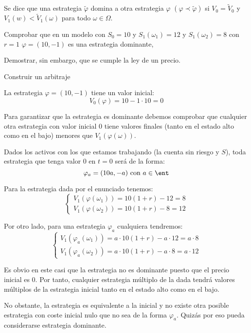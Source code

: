 \begin{problem}[5]
Se dice que una estrategia $\tilde{\varphi}$ domina a otra estrategia $\varphi$ $(\varphi \prec \tilde{\varphi})$ si $V_0=\tilde{V}_0$ y $V_1(w) < \tilde{V}_1(ω)$ para todo $ω \in Ω$.

\ppart Comprobar que en un modelo con $S_0=10$ y $S_1(ω_1)=12$ y $S_1(ω_2) = 8$ con $r=1$ $\varphi=(10,-1)$ es una estrategia dominante,

\ppart Demostrar, sin embargo, que se cumple la ley de un precio.

\ppart Construir un arbitraje
\solution

\spart
{}

La estrategia $\varphi = (10,-1)$ tiene un valor inicial:
\[V_0(\varphi)=10-1\cdot 10 = 0\]

Para garantizar que la estrategia es dominante debemos comprobar que cualquier otra estrategia con valor inicial 0 tiene valores finales (tanto en el estado alto como en el bajo) menores que $V_1(\varphi(ω))$.

Dados los activos con los que estamos trabajando (la cuenta sin riesgo y $S$), toda estrategia que tenga valor 0 en $t=0$ será de la forma:
\[\varphi_a = (10a, -a) \text{ con } a \in \ent\]

Para la estrategia dada por el enunciado tenemos:
\[\left\{ \begin{array}{l}
V_1(\varphi(ω_1))= 10(1+r) -12  = 8\\
V_1(\varphi(ω_2))= 10(1+r) - 8 = 12
\end{array}\right.\]

Por otro lado, para una estrategia $\varphi_a$ cualquiera tendremos:
\[\left\{ \begin{array}{l}
V_1(\varphi_a(ω_1))= a\cdot 10(1+r) -a\cdot 12  = a\cdot 8\\
V_1(\varphi_a(ω_2))= a\cdot 10(1+r) - a\cdot 8 = a\cdot 12
\end{array}\right.\]

Es obvio en este casi que la estrategia no es dominante puesto que el precio inicial es 0. Por tanto, cualquier estrategia múltiplo de la dada tendrá valores múltiplos de la estrategia inicial tanto en el estado alto como en el bajo.

No obstante, la estrategia es equivalente a la inicial y no existe otra posible estrategia con coste inicial nulo que no sea de la forma $\varphi_a$. Quizás por eso pueda considerarse estrategia dominante.

\spart



\end{problem}

